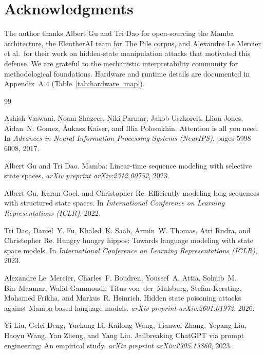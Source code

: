 \documentclass[10pt,twocolumn]{article}
\begin{document}
\section*{Acknowledgments}

The author thanks Albert Gu and Tri Dao for open-sourcing the Mamba architecture, the EleutherAI team for The Pile corpus, and Alexandre Le Mercier et al.\ for their work on hidden-state manipulation attacks that motivated this defense. We are grateful to the mechanistic interpretability community for methodological foundations. Hardware and runtime details are documented in Appendix~A.4 (Table~\ref{tab:hardware_map}).


\begin{thebibliography}{99}

Ashish Vaswani, Noam Shazeer, Niki Parmar, Jakob Uszkoreit, Llion Jones, Aidan~N. Gomez, Åukasz Kaiser, and Illia Polosukhin.
\newblock Attention is all you need.
\newblock In \emph{Advances in Neural Information Processing Systems (NeurIPS)}, pages 5998--6008, 2017.

Albert Gu and Tri Dao.
\newblock Mamba: Linear-time sequence modeling with selective state spaces.
\newblock \emph{arXiv preprint arXiv:2312.00752}, 2023.

Albert Gu, Karan Goel, and Christopher Re.
\newblock Efficiently modeling long sequences with structured state spaces.
\newblock In \emph{International Conference on Learning Representations (ICLR)}, 2022.

Tri Dao, Daniel~Y. Fu, Khaled~K. Saab, Armin~W. Thomas, Atri Rudra, and Christopher Re.
\newblock Hungry hungry hippos: Towards language modeling with state space models.
\newblock In \emph{International Conference on Learning Representations (ICLR)}, 2023.

Alexandre Le~Mercier, Charles~F. Boudren, Youssef~A. Attia, Sohaib~M. Bin~Maamar, Walid Gammoudi, Titus von~der~Malsburg, Stefan Kersting, Mohamed Frikha, and Markus~R. Heinrich.
\newblock Hidden state poisoning attacks against Mamba-based language models.
\newblock \emph{arXiv preprint arXiv:2601.01972}, 2026.

Yi Liu, Gelei Deng, Yuekang Li, Kailong Wang, Tianwei Zhang, Yepang Liu, Haoyu Wang, Yan Zheng, and Yang Liu.
\newblock Jailbreaking ChatGPT via prompt engineering: An empirical study.
\newblock \emph{arXiv preprint arXiv:2305.13860}, 2023.


\end{thebibliography}
\end{document}
